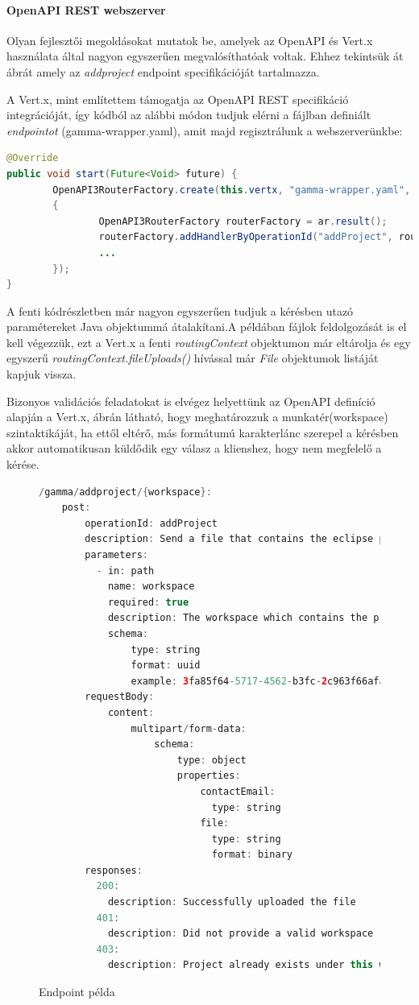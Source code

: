 \paragraph{OpenAPI REST webszerver} Olyan fejlesztői megoldásokat mutatok be, amelyek az OpenAPI és Vert.x használata által nagyon egyszerűen megvalósíthatóak voltak. Ehhez tekintsük át  ábrát amely az \textit{addproject} endpoint specifikációját tartalmazza.

A Vert.x, mint említettem támogatja az OpenAPI REST specifikáció integrációját, így kódból az alábbi módon tudjuk elérni a fájlban definiált \textit{endpointot} (gamma-wrapper.yaml), amit majd regisztrálunk a webszerverünkbe:
\begin{lstlisting}[language=Java]
@Override
public void start(Future<Void> future) {
        OpenAPI3RouterFactory.create(this.vertx, "gamma-wrapper.yaml", ar ->
		{
               	OpenAPI3RouterFactory routerFactory = ar.result();
                routerFactory.addHandlerByOperationId("addProject", routingContext -> {	... });
				...	
		});
}
\end{lstlisting}
A fenti kódrészletben már nagyon egyszerűen tudjuk a kérésben utazó paramétereket Java objektummá átalakítani.A példában fájlok feldolgozását is el kell végezzük, ezt a Vert.x a fenti \textit{routingContext} objektumon már eltárolja és egy egyszerű \textit{routingContext.fileUploads()} hívással már \textit{File} objektumok listáját kapjuk vissza.


Bizonyos validációs feladatokat is elvégez helyettünk az OpenAPI definíció alapján a Vert.x,  ábrán látható, hogy meghatározzuk a munkatér(workspace) szintaktikáját, ha ettől eltérő, más formátumú karakterlánc szerepel a kérésben akkor automatikusan küldődik egy válasz a klienshez, hogy nem megfelelő a kérése.



\begin{figure}[!ht]
\begin{lstlisting}[language=Java]
 /gamma/addproject/{workspace}:
	post:
		operationId: addProject
		description: Send a file that contains the eclipse project on which the gamma operations will run
		parameters:
		  - in: path
			name: workspace
			required: true
			description: The workspace which contains the project
			schema:
				type: string
				format: uuid
				example: 3fa85f64-5717-4562-b3fc-2c963f66afa6
		requestBody:
			content:
				multipart/form-data:
					schema:
						type: object
						properties:
							contactEmail:
  							  type: string
							file:
							  type: string
							  format: binary
		responses:
		  200:
			description: Successfully uploaded the file
		  401:
			description: Did not provide a valid workspace
		  403:
			description: Project already exists under this workspace, delete it and resend this request

\end{lstlisting}
	\caption{Endpoint példa}
	\label{fig:endpoint_example}
\end{figure}

